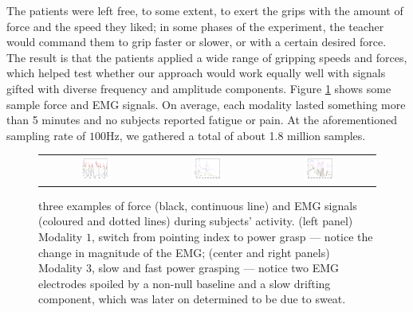 The patients were left free, to some extent, to exert the grips with
the amount of force and the speed they liked; in some phases of the
experiment, the teacher would command them to grip faster or slower,
or with a certain desired force. The result is that the patients
applied a wide range of gripping speeds and forces, which helped test
whether our approach would work equally well with signals gifted with
diverse frequency and amplitude components. Figure
\ref{fig:ex_signals} shows some sample force and EMG signals. On
average, each modality lasted something more than 5 minutes and no
subjects reported fatigue or pain. At the aforementioned sampling rate
of $100$Hz, we gathered a total of about 1.8 million samples.

\begin{figure}[!ht] \centering
  \begin{tabular}{ccc}
    \includegraphics[width=0.3\textwidth]{figs/example_signal1} &
    \includegraphics[width=0.3\textwidth]{figs/example_signal2} &
    \includegraphics[width=0.3\textwidth]{figs/example_signal3} \\
  \end{tabular}
  \caption{three examples of force (black, continuous line) and EMG
    signals (coloured and dotted lines) during subjects'
    activity. (left panel) Modality $1$, switch from pointing index to
    power grasp --- notice the change in magnitude of the EMG; (center
    and right panels) Modality $3$, slow and fast power grasping ---
    notice two EMG electrodes spoiled by a non-null baseline and a
    slow drifting component, which was later on determined to be due
    to sweat.}
  \label{fig:ex_signals}
\end{figure}

